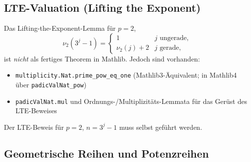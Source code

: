 \documentclass[12pt,a4paper]{article}
\newcommand{\vii}{\nu_2}
\begin{document}
\subsection{LTE-Valuation (Lifting the Exponent)}

\begin{tcolorbox}[teilweise, title={Teilweise vorhanden: Multiplikativität und Potenzen}]
Das Lifting-the-Exponent-Lemma für $p=2$,
\[
  \vii(3^j - 1) = \begin{cases} 1 & j \text{ ungerade,}\\ \vii(j)+2 & j \text{ gerade,}\end{cases}
\]
ist \emph{nicht} als fertiges Theorem in Mathlib. Jedoch sind vorhanden:
\begin{itemize}[nosep]
  \item \texttt{multiplicity.Nat.prime\_pow\_eq\_one} (Mathlib3-Äquivalent; in Mathlib4
        über \texttt{padicValNat\_pow})
  \item \texttt{padicValNat.mul} und Ordnungs-/Multiplizitäts-Lemmata für das
        Gerüst des LTE-Beweises
\end{itemize}

Der LTE-Beweis für $p=2$, $n=3^j-1$ muss selbst geführt werden.
\end{tcolorbox}

\subsection{Geometrische Reihen und Potenzreihen}
\end{document}
